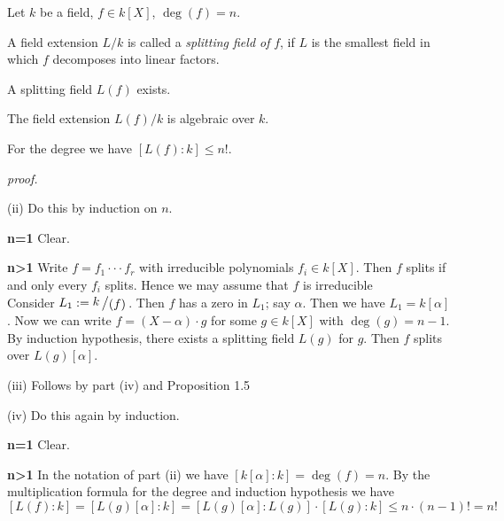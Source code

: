 \documentclass[11pt]{book}
\theoremstyle{nonumberbreak}
\newenvironment{definprop}[1][]{\ifthenelse{\equal{#1}{}}{\definiprop}{\definiprop[#1]}\rm}{\enddefiniprop}
\newcommand{\slant}[2]{{\raisebox{.1em}{$#1$}\left/\raisebox{-.1em}{$#2$}\right.}}
\begin{document}
\begin{spacing}{1.3}
\begin{definprop} %
Let $k$ be a field, $f \in k[X]$, $\deg(f)=n$.
\begin{compactenum}
\item A field extension $L/k$ is called a \textit{splitting field of} $f$, if $L$ is the smallest field in which $f$ decomposes into linear factors.
\item A splitting field $L(f)$ exists.
\item The field extension $L(f)/k$ is algebraic over $k$.
\item For the degree we have $[L(f):k] \leqslant n!$.
\end{compactenum}
\textit{proof.}
\begin{compactenum}
\item[(ii)] Do this by induction on $n$.
\begin{compactenum}
\item[\textbf{n=1}] Clear.
\item[\textbf{n>1}] Write $f= f_1 \cdot \cdot \cdot f_r$ with irreducible polynomials $f_i \in k[X]$. Then $f$ splits if and only every $f_i$ splits. Hence we may assume that $f$ is irreducible\\
Consider $L_1:=\slant{k}{( f )}$. Then $f$ has a zero in $L_1$; say $\alpha$. Then we have $L_1=k[\alpha]$. Now we can write $f = (X-\alpha) \cdot g$ for some $g \in k[X]$ with $\deg(g)=n-1$. By induction hypothesis, there exists a splitting field $L(g)$ for $g$. Then $f$ splits over $L(g)[\alpha]$.
\end{compactenum}
\item[(iii)] Follows by part (iv) and Proposition 1.5
\item[(iv)] Do this again by induction.
\begin{compactenum}
\item[\textbf{n=1}] Clear.
\item[\textbf{n>1}] In the notation of part (ii) we have $[k[\alpha]:k]=\deg(f)=n$. By the multiplication formula for the degree and induction hypothesis we have
$$[L(f):k]=[L(g)[\alpha]:k]=[L(g)[\alpha]:L(g)] \cdot [L(g): k] \leqslant n \cdot (n-1)!=n!$$
\end{compactenum}
\end{compactenum}
\end{definprop}




\end{spacing}
\end{document}

